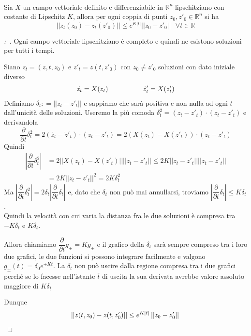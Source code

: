\documentclass[11pt,a4paper,twoside]{book}
\newenvironment{proposizione}[1][\empty]{\begin{Proposizione}{
\ifx\empty#1\relax\else\mdseries\itshape#1\\\fi
}{}}{\end{Proposizione}}
\newenvironment{dimo}[1][\proofname]{
	\begin{tcolorbox}[
	breakable, 
	enhanced, 
	interior hidden, 
	frame hidden, 
	borderline west = {1pt}{0pt}{gray}, 
	top=0pt, bottom=0pt, left=0pt]
\begin{proof}[#1:~]
}
{
\end{proof}
\end{tcolorbox}
}
\theoremstyle{esss}
\theoremstyle{dotless}
\numberwithin{equation}{section} %
\begin{document}
\begin{proposizione}
Sia $X$ un campo vettoriale definito e differenziabile in $\mathbb{R}^n$ lipschitziano con costante di Lipschitz $K$, allora per ogni coppia di punti $z_0,z'_0\in\mathbb{R}^n$ si ha
\[
\left|\left| z_t(z_0)-z_t(z'_0) \right|\right| \leq e^{K\left|t\right|} \left|\left| z_0-z'_0 \right|\right| \>\>\> \forall t\in\mathbb{R}
\]
\end{proposizione}
\begin{dimo}
Ogni campo vettoriale lipschitziano è completo e quindi ne esistono soluzioni per tutti i tempi.

Siano $z_t=(z,t,z_0)$ e $z'_t=z(t,z'_0)$ con $z_0\neq z'_0$ soluzioni con dato iniziale diverso
\[
\dot{z_t}=X(z_t) \hspace{0.15\linewidth} \dot{z}'_t=X(z'_t)
\]
Definiamo $\delta_t\mathrel{\mathop:}=\left|\left| z_t-z'_t\right|\right|$ e sappiamo che sarà positiva e non nulla ad ogni $t$ dall'unicità delle soluzioni. Useremo la più comoda $\delta_t^2 = (z_t-z'_t)\cdot(z_t-z'_t)$ e derivandola
\[
\dfrac{\partial}{\partial t} \delta_t^2 = 2(\dot{z_t}-\dot{z}'_t)\cdot(z_t-z'_t)=2\left(X(z_t)-X(z'_t)\right)\cdot(z_t-z'_t) 
\]
Quindi
\begin{align*}
\left| \dfrac{\partial}{\partial t} \delta_t^2  \right| &= 2\left|\left| X(z_t)-X(z'_t) \right|\right| \left|\left|  z_t-z'_t \right|\right| \leq 2 K \left|\left| z_t-z'_t \right|\right| \left|\left| z_t-z'_t \right|\right| \\&= 2K \left|\left| z_t-z'_t \right|\right|^2=2K\delta_t^2
\end{align*}
Ma $\left| \dfrac{\partial}{\partial t} \delta_t^2  \right|=2\delta_t\left|\dfrac{\partial}{\partial t}\delta_t\right|$ e, dato che $\delta_t$ non può mai annullarsi, troviamo
$\left|\dfrac{\partial}{\partial t} \delta_t \right|\leq K\delta_t$.\\
Quindi la velocità con cui varia la distanza fra le due soluzioni è compresa tra $-K\delta_t$ e $K\delta_t$.\footnotemark

Allora chiamiamo $\dfrac{\partial}{\partial t}g_\pm = K g_\pm $ e il grafico della $\delta_t$ sarà sempre compreso tra i loro due grafici, le due funzioni si possono integrare facilmente e valgono $g_\pm(t)=\delta_0 e^{\pm Kt}$. La $\delta_t$ non può uscire dalla regione compresa tra i due grafici perché se lo facesse nell'istante $\overline{t}$ di uscita la sua derivata avrebbe valore assoluto maggiore di $K\delta_{\overline{t}}$

Dunque 
\[\left|\left|  z(t,z_0)-z(t,z'_0) \right|\right|\leq e^{K \left| t \right|} \left|\left|  z_0-z'_0 \right|\right|
\qedhere\]
\end{dimo}
\end{document}
